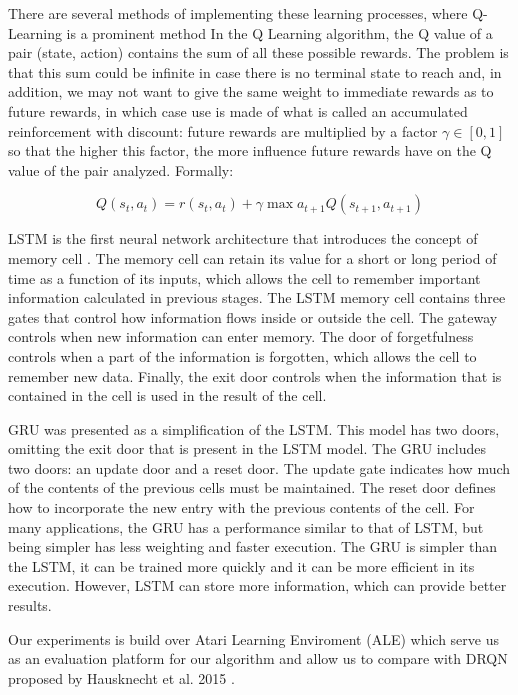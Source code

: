 \documentclass[conference]{IEEEtran}
\begin{document}
There are several methods of implementing these learning processes, where Q-Learning is a prominent method
In the Q Learning algorithm, the Q value of a pair (state, action) contains the sum of all these possible rewards. The problem is that this sum could be infinite in case there is no terminal state to reach and, in addition, we may not want to give the same weight to immediate rewards as to future rewards, in which case use is made of what is called an accumulated reinforcement with discount: future rewards are multiplied by a factor $\gamma \in [0,1] $ so that the higher this factor, the more influence future rewards have on the Q value of the pair analyzed. Formally:

\begin{equation}
    Q(s_t,a_t)=r(s_t,a_t) + \gamma \max a_{t+1}Q(s_{t+1},a_{t+1})
\end{equation}



LSTM is the first neural network architecture that introduces the concept of memory cell \cite{b5}.
The memory cell can retain its value for a short or long period of time as a function of its inputs, which allows the cell to remember important information calculated in previous stages.
The LSTM memory cell contains three gates that control how information flows inside or outside the cell. The gateway controls when new information can enter memory. The door of forgetfulness controls when a part of the information is forgotten, which allows the cell to remember new data. Finally, the exit door controls when the information that is contained in the cell is used in the result of the cell.

GRU was presented as a simplification of the LSTM.
This model has two doors, omitting the exit door that is present in the LSTM model.
The GRU includes two doors: an update door and a reset door. The update gate indicates how much of the contents of the previous cells must be maintained. The reset door defines how to incorporate the new entry with the previous contents of the cell.
For many applications, the GRU has a performance similar to that of LSTM, but being simpler has less weighting and faster execution.
The GRU is simpler than the LSTM, it can be trained more quickly and it can be more efficient in its execution. However, LSTM can store more information, which can provide better results.

Our experiments is build over Atari Learning Enviroment (ALE) \cite{b3} which serve us as an evaluation platform for our algorithm and allow us to compare with DRQN proposed by Hausknecht et al. 2015 \cite{b2}.
\end{document}
